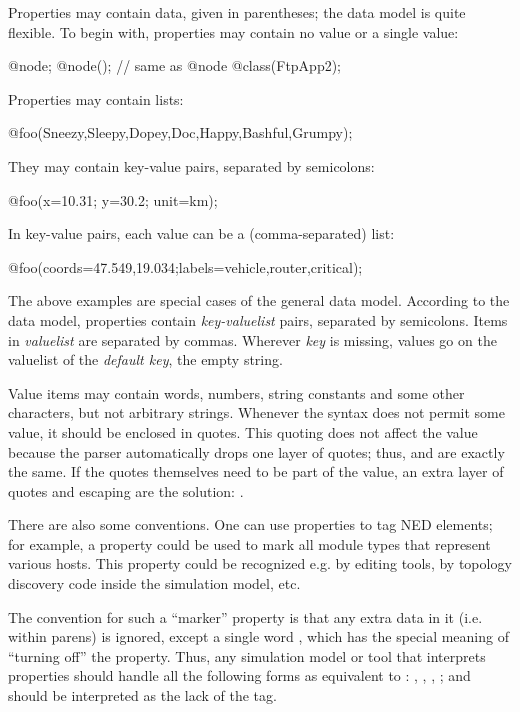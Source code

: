 Properties may contain data, given in parentheses; the data model is quite
flexible. To begin with, properties may contain no value or a single
value:

\begin{ned}
@node;
@node(); // same as @node
@class(FtpApp2);
\end{ned}

Properties may contain lists:

\begin{ned}
@foo(Sneezy,Sleepy,Dopey,Doc,Happy,Bashful,Grumpy);
\end{ned}

They may contain key-value pairs, separated by semicolons:

\begin{ned}
@foo(x=10.31; y=30.2; unit=km);
\end{ned}

In key-value pairs, each value can be a (comma-separated) list:

\begin{ned}
@foo(coords=47.549,19.034;labels=vehicle,router,critical);
\end{ned}

The above examples are special cases of the general data model. According
to the data model, properties contain \textit{key-valuelist} pairs,
separated by semicolons. Items in \textit{valuelist} are separated by
commas. Wherever \textit{key} is missing, values go on the valuelist of the
\textit{default key}, the empty string.

Value items may contain words, numbers, string constants and some other
characters, but not arbitrary strings. Whenever the syntax does not permit
some value, it should be enclosed in quotes. This quoting does not affect
the value because the parser automatically drops one layer of quotes; thus,
 and  are exactly the same. If the
quotes themselves need to be part of the value, an extra layer of quotes
and escaping are the solution: .

There are also some conventions. One can use properties to tag NED
elements; for example, a  property could be used to mark all
module types that represent various hosts. This property could be
recognized e.g. by editing tools, by topology discovery code inside the
simulation model, etc.

The convention for such a ``marker'' property is that any extra data in it
(i.e. within parens) is ignored, except a single word , which has
the special meaning of ``turning off'' the property. Thus, any simulation model
or tool that interprets properties should handle all the following forms as
equivalent to : , ,
, ; and
 should be interpreted as the lack of the 
tag.


